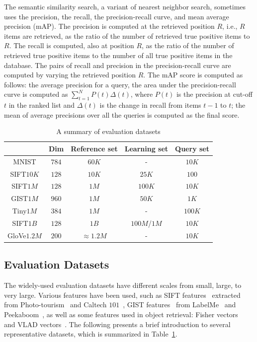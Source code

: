 \documentclass[10pt,journal,compsoc]{IEEEtran}
\begin{document}
The semantic similarity search,
a variant of nearest neighbor search,
sometimes uses the precision,
the recall,
the precision-recall curve,
and
mean average precision (mAP).
The precision is computed
at the retrieved position $R$,
i.e., $R$ items are retrieved,
as the ratio of the number of retrieved true positive items to $R$.
The recall is computed,
also at position $R$,
as the ratio of the number of retrieved true positive items
to the number of all true positive items in the database.
The pairs of recall
and precision
in the precision-recall curve
are computed by varying the retrieved position $R$.
The mAP score is computed as follows:
the average precision for a query,
the area under the precision-recall curve is computed as
$\sum_{t=1}^N P(t)\Delta(t)$,
where $P(t)$ is the precision at cut-off $t$ in the ranked list
and $\Delta(t)$ is the change
in recall from items $t-1$ to $t$;
the mean of average precisions over all the queries
is computed as the final score.



\begin{table}[!t]
\caption{A summary of evaluation datasets}
\vspace{-.3cm}
\label{table:evaluationdatasets}
\centering
\begin{tabular}{|c||c||c|c|c|}
\hline
 & Dim & Reference set & Learning set & Query set \\
\hline
MNIST & $784$ & $60K$ & - & $10K$\\
SIFT$10K$ & $128$ & $10K$ & $25K$ & $100$  \\
SIFT$1M$ & $128$ & $1M$ & $100K$ & $10K$  \\
GIST$1M$ & $960$ & $1M$ & $50K$ & $1K$  \\
Tiny$1M$ & $384$ & $1M$ & - & $100K$  \\
SIFT$1B$ & $128$ & $1B$ & $100M$/$1M$ & $10K$  \\
GloVe$1.2M$ & $200$ & $\approx1.2M$ & - & $10K$  \\
\hline
\end{tabular}
\vspace{-.3cm}
\end{table}
\subsection{Evaluation Datasets}
The widely-used evaluation datasets
have different scales
from small, large,
to very large.
Various features have been used,
such as SIFT features~\cite{Lowe04}
extracted from Photo-tourism~\cite{SnavelySS06}
and Caltech $101$~\cite{FeiFP04},
GIST features~\cite{OlivaT01}
from LabelMe~\cite{RussellTMF08} and Peekaboom~\cite{AhnLB06},
as well as some features used in object retrieval:
Fisher vectors~\cite{PerronninLSP10} and VLAD vectors~\cite{JegouDSP10}.
The following presents a brief introduction
to several representative datasets,
which is summarized in Table~\ref{table:evaluationdatasets}.
\end{document}
